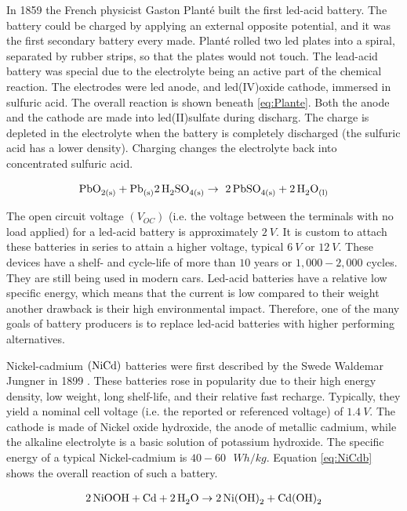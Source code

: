 In 1859 the French physicist Gaston Planté built the first led-acid battery. The battery could be charged by applying an external opposite potential, and it was the first secondary battery every made. Planté rolled two led plates into a spiral, separated by rubber strips, so that the plates would not touch. The lead-acid battery was special due to the electrolyte being an active part of the chemical reaction. The electrodes were led anode, and led(IV)oxide cathode, immersed in sulfuric acid. The overall reaction is shown beneath \ref{eq:Plante}. Both the anode and the cathode are made into led(II)sulfate during discharg. The charge is depleted in the electrolyte when the battery is completely discharged (the sulfuric acid has a lower density). Charging changes the electrolyte back into concentrated sulfuric acid. 

\begin{align}\label{eq:Plante}
\ce{PbO_{2(s)}} + \ce{Pb_{(s)}} \ce{2H_2SO_{4(s)}} \rightarrow \ce{2PbSO_{4(s)}} +\ce{2H_2O_{(l)}}
\end{align}

The open circuit voltage $(V_{OC})$ (i.e. the voltage between the terminals with no load applied) for a led-acid battery is approximately $\SI{2}{V}$. It is custom to attach these batteries in series to attain a higher voltage, typical $\SI{6}{V}$ or $\SI{12}{V}$. These devices have a shelf- and cycle-life of more than $10$ years or $1,000-2,000$ cycles. They are still being used in modern cars. Led-acid batteries have a relative low specific energy, which means that the current is low compared to their weight another drawback is their high environmental impact. Therefore, one of the many goals of battery producers is to replace led-acid batteries with higher performing alternatives.  

Nickel-cadmium $(\ce{NiCd})$ batteries were first described by the Swede Waldemar Jungner in 1899 \cite{daniel2012handbook}. These batteries rose in popularity due to their high energy density, low weight, long shelf-life, and their relative fast recharge. Typically, they yield a nominal cell voltage (i.e. the reported or referenced voltage) of $\SI{1.4}{V}$. The cathode is made of Nickel oxide hydroxide, the anode of metallic cadmium, while the alkaline electrolyte is a basic solution of potassium hydroxide. The specific energy of a typical Nickel-cadmium is $40-60\text{ }\si{W h/kg}$. Equation \ref{eq:NiCdb} shows the overall reaction of such a battery.

\begin{align}\label{eq:NiCdb}
\ce{2NiOOH} + \ce{Cd} + \ce{2H_2O} \rightarrow \ce{2Ni(OH)_2} + \ce{Cd(OH)_2}
\end{align}

